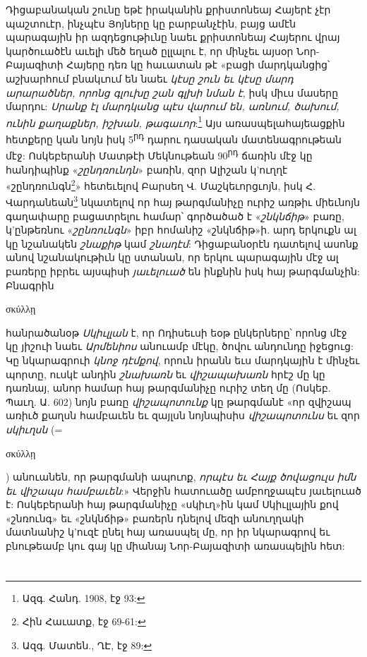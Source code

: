 \documentclass{article}
\begin{document}
{Դիցաբանական շունը եթէ իրականին քրիստոնեայ Հայերէ չէր պաշտուէր, ինչպէս Յոյները կը բարբանչէին, բայց ամէն պարագային իր ազդեցութիւնը նաեւ քրիստոնեայ Հայերու վրայ կարծուածէն աւելի մեծ եղած ըլլալու է, որ մինչեւ այսօր Նոր-Բայազիտի Հայերը դեռ կը հաւատան թէ «բացի մարդկանցից՝ աշխարհում բնակւում են նաեւ \emph{կէսը շուն եւ կէսը մարդ արարածներ, որոնց գլուխը շան գլխի նման է}, իսկ միւս մասերը մարդու: \emph{Սրանք էլ մարդկանց պէս վարում են, առնում, ծախում, ունին քաղաքներ, իշխան, թագաւոր}:\footnote{Ազգ. Հանդ. 1908, էջ 93:} Այս առասպելահայեացքին հետքերը կան նոյն իսկ 5\textsuperscript{րդ} դարու դասական մատենագրութեան մէջ: Ոսկեբերանի Մատթէի Մեկնութեան 90\textsuperscript{րդ} ճառին մէջ կը հանդիպինք «\emph{շընդռունդն}» բառին, զոր Ալիշան կ'ուղղէ «շընդռունգն\footnote{Հին Հաւատք, էջ 69-61:}» հետեւելով Բարսեղ Վ. Մաշկեւորցւոյն, իսկ Հ. Վարդանեան\footnote{Ազգ. Մատեն., ՂԷ, էջ 89:} նկատելով որ հայ թարգմանիչը ուրիշ առթիւ միեւնոյն գաղափարը բացատրելու համար՝ գործածած է «\emph{շնկնճիթ}» բառը, կ'ընթեռնու «\emph{շընռունգն}» իբր հոմանիշ «շնկնճիթ»ի. արդ երկուքն ալ կը նշանակեն \emph{շնաքիթ} կամ \emph{շնադէմ}: Դիցաբանօրէն դատելով ասոնք անով նշանակութիւն կը ստանան, որ երկու պարագային մէջ ալ բառերը իբրեւ այսպիսի \emph{յաւելուած} են ինքնին իսկ հայ թարգմանչին: Բնագրին \begin{greek}σκύλλῃ\end{greek} հանրածանօթ \emph{Սկիւլլան} է, որ Ոդիսեւսի եօթ ընկերները՝ որոնց մէջ կը յիշուի նաեւ \emph{Արմենիոս} անուամբ մէկը, ծովու անդունդը իջեցուց: Կը նկարագրուի \emph{կնոջ դէմքով}, որուն իրանն եւս մարդկային է մինչեւ պորտը, ուսկէ անդին \emph{շնախառն} եւ \emph{վիշապախառն} հրէշ մը կը դառնայ, անոր համար հայ թարգմանիչը ուրիշ տեղ մը (Ոսկեբ. Պաւղ. Ա. 602) նոյն բառը \emph{վիշապոտունք} կը թարգմանէ «որ զվիշապ առիւծ քաղսն համբաւեն եւ զայլսն նոյնպիսիս \emph{վիշապոտունս} եւ զոր \emph{սկիւղսն} (= \begin{greek}σκύλλῃ\end{greek}) անուանեն, որ թարգմանի ապուոք, \emph{որպէս եւ Հայք ծովացուլս իմն եւ վիշապս համբաւեն}:» Վերջին հատուածը ամբողջապէս յաւելուած է: Ոսկեբերանի հայ թարգմանիչը «սկիւղ»ին կամ Սկիւլլային քով «շնռունգ» եւ «շնկնճիթ» բառերն դնելով մեզի անուղղակի մատնանիշ կ'ուզէ ընել հայ առասպել մը, որ իր նկարագրով եւ բնութեամբ կու գայ կը միանայ Նոր-Բայազիտի առասպելին հետ:}
\clearpage
\section{}
\subsection{}
\end{document}
